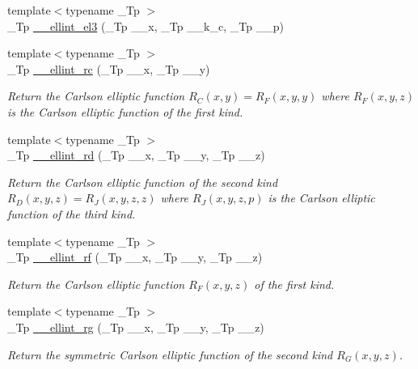 \begin{DoxyCompactItemize}
\item 
{\footnotesize template$<$typename \+\_\+\+Tp $>$ }\\\+\_\+\+Tp \hyperlink{namespacestd_1_1____detail_a2a2b5b80edd39b3d1f852f10c5f277fc}{\+\_\+\+\_\+ellint\+\_\+el3} (\+\_\+\+Tp \+\_\+\+\_\+x, \+\_\+\+Tp \+\_\+\+\_\+k\+\_\+c, \+\_\+\+Tp \+\_\+\+\_\+p)
\item 
{\footnotesize template$<$typename \+\_\+\+Tp $>$ }\\\+\_\+\+Tp \hyperlink{namespacestd_1_1____detail_aa7d81e41240a6d031414c6b117889e36}{\+\_\+\+\_\+ellint\+\_\+rc} (\+\_\+\+Tp \+\_\+\+\_\+x, \+\_\+\+Tp \+\_\+\+\_\+y)
\begin{DoxyCompactList}\small\item\em Return the Carlson elliptic function $ R_C(x,y) = R_F(x,y,y) $ where $ R_F(x,y,z) $ is the Carlson elliptic function of the first kind. \end{DoxyCompactList}\item 
{\footnotesize template$<$typename \+\_\+\+Tp $>$ }\\\+\_\+\+Tp \hyperlink{namespacestd_1_1____detail_ac05883415a662fc6f9855dd8d1da921f}{\+\_\+\+\_\+ellint\+\_\+rd} (\+\_\+\+Tp \+\_\+\+\_\+x, \+\_\+\+Tp \+\_\+\+\_\+y, \+\_\+\+Tp \+\_\+\+\_\+z)
\begin{DoxyCompactList}\small\item\em Return the Carlson elliptic function of the second kind $ R_D(x,y,z) = R_J(x,y,z,z) $ where $ R_J(x,y,z,p) $ is the Carlson elliptic function of the third kind. \end{DoxyCompactList}\item 
{\footnotesize template$<$typename \+\_\+\+Tp $>$ }\\\+\_\+\+Tp \hyperlink{namespacestd_1_1____detail_a2cca271dcbdf22923219eab7a02450d5}{\+\_\+\+\_\+ellint\+\_\+rf} (\+\_\+\+Tp \+\_\+\+\_\+x, \+\_\+\+Tp \+\_\+\+\_\+y, \+\_\+\+Tp \+\_\+\+\_\+z)
\begin{DoxyCompactList}\small\item\em Return the Carlson elliptic function $ R_F(x,y,z) $ of the first kind. \end{DoxyCompactList}\item 
{\footnotesize template$<$typename \+\_\+\+Tp $>$ }\\\+\_\+\+Tp \hyperlink{namespacestd_1_1____detail_aaceff1eb320e0602afee36c60b80f87a}{\+\_\+\+\_\+ellint\+\_\+rg} (\+\_\+\+Tp \+\_\+\+\_\+x, \+\_\+\+Tp \+\_\+\+\_\+y, \+\_\+\+Tp \+\_\+\+\_\+z)
\begin{DoxyCompactList}\small\item\em Return the symmetric Carlson elliptic function of the second kind $ R_G(x,y,z) $. \end{DoxyCompactList}\item 

\end{DoxyCompactItemize}
